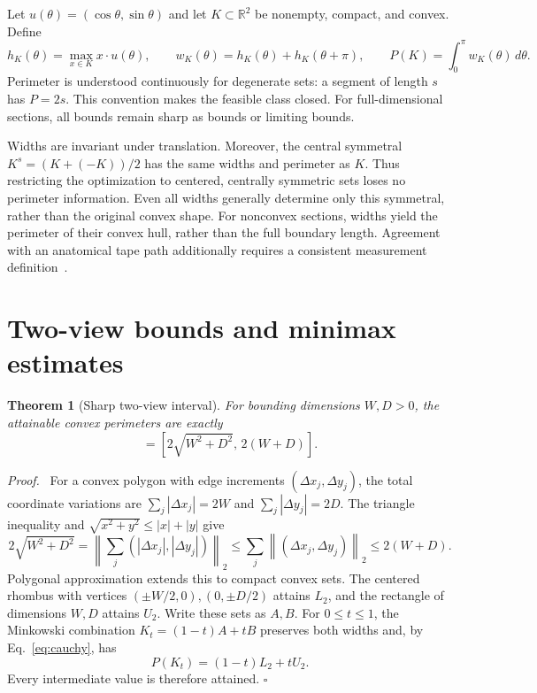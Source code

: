 \documentclass[11pt,a4paper]{article}
\newtheorem{theorem}{Theorem}
\newenvironment{proof}{\par\noindent\textit{Proof.}\ }{\hfill$\square$\par\medskip}
\newcommand{\R}{\mathbb R}
\newcommand{\norm}[1]{\left\lVert#1\right\rVert}
\begin{document}
Let $u(\theta)=(\cos\theta,\sin\theta)$ and let $K\subset\R^2$ be nonempty, compact, and convex. Define
\begin{equation}
h_K(\theta)=\max_{x\in K}x\cdot u(\theta),\qquad
w_K(\theta)=h_K(\theta)+h_K(\theta+\pi),\qquad
P(K)=\int_0^\pi w_K(\theta)\,d\theta.
\label{eq:cauchy}
\end{equation}
Perimeter is understood continuously for degenerate sets: a segment of length $s$ has $P=2s$. This convention makes the feasible class closed. For full-dimensional sections, all bounds remain sharp as bounds or limiting bounds.

Widths are invariant under translation. Moreover, the central symmetral $K^s=(K+(-K))/2$ has the same widths and perimeter as $K$. Thus restricting the optimization to centered, centrally symmetric sets loses no perimeter information. Even all widths generally determine only this symmetral, rather than the original convex shape. For nonconvex sections, widths yield the perimeter of their convex hull, rather than the full boundary length. Agreement with an anatomical tape path additionally requires a consistent measurement definition~\cite{iso}.

\section{Two-view bounds and minimax estimates}
\begin{theorem}[Sharp two-view interval]
\label{thm:two}
For bounding dimensions $W,D>0$, the attainable convex perimeters are exactly
\begin{equation}
[L_2,U_2]=[2\sqrt{W^2+D^2},\,2(W+D)].
\label{eq:two}
\end{equation}
\end{theorem}
\begin{proof}
For a convex polygon with edge increments $(\Delta x_j,\Delta y_j)$, the total coordinate variations are $\sum_j|\Delta x_j|=2W$ and $\sum_j|\Delta y_j|=2D$. The triangle inequality and $\sqrt{x^2+y^2}\le |x|+|y|$ give
\begin{equation}
2\sqrt{W^2+D^2}
=\norm{\sum_j(|\Delta x_j|,|\Delta y_j|)}_2
\le \sum_j\norm{(\Delta x_j,\Delta y_j)}_2
\le2(W+D).
\end{equation}
Polygonal approximation extends this to compact convex sets. The centered rhombus with vertices $(\pm W/2,0),(0,\pm D/2)$ attains $L_2$, and the rectangle of dimensions $W,D$ attains $U_2$. Write these sets as $A,B$. For $0\le t\le1$, the Minkowski combination $K_t=(1-t)A+tB$ preserves both widths and, by Eq.~\eqref{eq:cauchy}, has
\begin{equation}
P(K_t)=(1-t)L_2+tU_2.
\label{eq:witness}
\end{equation}
Every intermediate value is therefore attained.
\end{proof}
\end{document}
